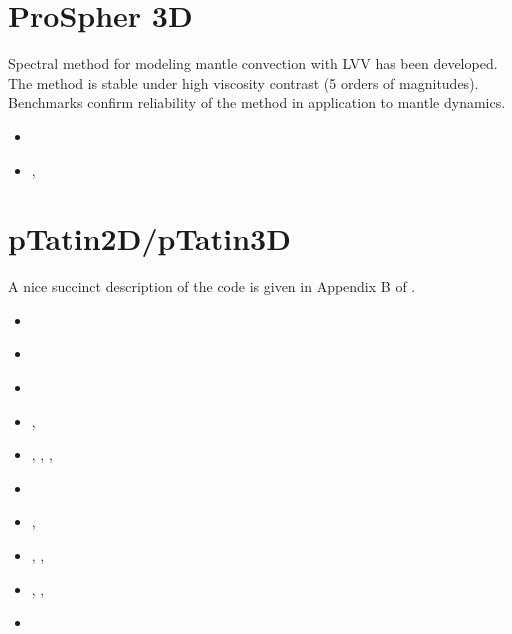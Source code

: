 \section{ProSpher 3D}

Spectral method for modeling mantle convection with LVV has been developed.
The method is stable under high viscosity contrast (5 orders of magnitudes).
Benchmarks confirm reliability of the method in application to mantle dynamics.

\begin{small}
\begin{itemize}
\item[\twothousandthirteen] \textcite{pekr13} 
\item[\twothousandtwenty]   \textcite{peke20}, \textcite{pekk20}
\end{itemize}
\end{small}

\section{pTatin2D/pTatin3D}
A nice succinct description of the code is given in Appendix B of \cite{lemh17}. 
\begin{small}
\begin{itemize}
\item[\twothousandthirteen]   \textcite{phil13}
\item[\twothousandfourteen]   \textcite{mabl14}
\item[\twothousandfifteen]    \textcite{mabl15}
\item[\twothousandseventeen]  \textcite{lemh17},  \textcite{magm17}
\item[\twothousandeighteen]   \textcite{jolp18},  \textcite{lecd18}, \textcite{jolp18b},
                              \textcite{hapl18}
\item[\twothousandnineteen]   \textcite{jolm19}
\item[\twothousandtwenty]     \textcite{duhm20},  \textcite{jolm20}
\item[\twothousandtwentyone]  \textcite{jokd21},  \textcite{iola21}, \textcite{pelg21}
\item[\twothousandtwentytwo]  \textcite{lala22},  \textcite{iobr22}, \textcite{wohw22}
\item[\twothousandtwentyfour] \textcite{pelj24}
\end{itemize}
\end{small}


